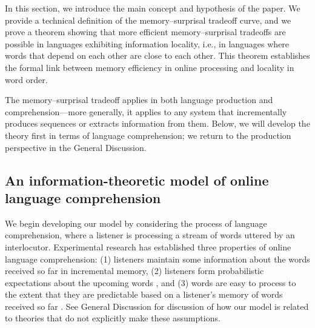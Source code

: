 In this section, we introduce the main concept and hypothesis of the paper. %
We provide a technical definition of the memory--surprisal tradeoff curve, and we prove a theorem showing that more efficient memory--surprisal tradeoffs are possible in languages exhibiting information locality, i.e., in languages where words that depend on each other are close to each other. This theorem establishes the formal link between memory efficiency in online processing and locality in word order.

The memory--surprisal tradeoff applies in both language production and comprehension---more generally, it applies to any system that incrementally produces sequences or extracts information from them. Below, we will develop the theory first in terms of language comprehension; we return to the production perspective in the General Discussion. %



\subsection{An information-theoretic model of online language comprehension}
\label{sec:listener-tradeoff}

We begin developing our model by considering the process of language comprehension, where a listener is processing a stream of words uttered by an interlocutor.
Experimental research has established three properties of online language comprehension: (1) listeners maintain some information about the words received so far in incremental memory, (2) listeners form probabilistic expectations about the upcoming words \citep[e.g.][]{altmann1999incremental,staub2006syntactic,kuperberg2016we}, and (3) words are easy to process to the extent that they are predictable based on a listener's memory of words received so far \citep{hale2001probabilistic,levy2008expectation,futrell2020lossy}. 
See General Discussion %
for discussion of how our model is related to theories that do not explicitly make these assumptions.

